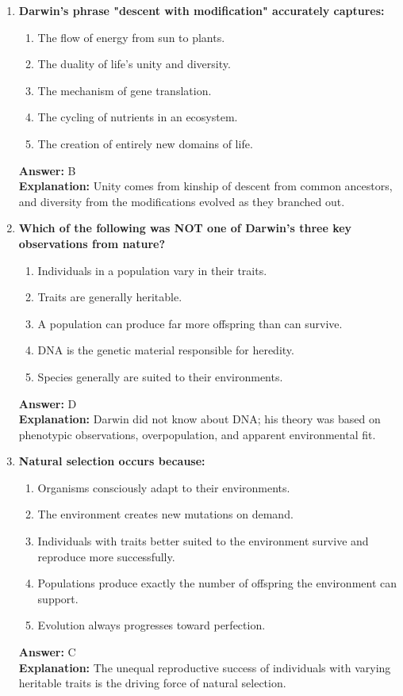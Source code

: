 \documentclass[11pt, a4paper]{article}
\begin{document}
\begin{enumerate}
\item \textbf{Darwin's phrase "descent with modification" accurately captures:}
\begin{enumerate}[label=\Alph*.]
    \item The flow of energy from sun to plants.
    \item The duality of life's unity and diversity.
    \item The mechanism of gene translation.
    \item The cycling of nutrients in an ecosystem.
    \item The creation of entirely new domains of life.
\end{enumerate}
\textbf{Answer:} B \\
\textbf{Explanation:} Unity comes from kinship of descent from common ancestors, and diversity from the modifications evolved as they branched out.

\item \textbf{Which of the following was NOT one of Darwin's three key observations from nature?}
\begin{enumerate}[label=\Alph*.]
    \item Individuals in a population vary in their traits.
    \item Traits are generally heritable.
    \item A population can produce far more offspring than can survive.
    \item DNA is the genetic material responsible for heredity.
    \item Species generally are suited to their environments.
\end{enumerate}
\textbf{Answer:} D \\
\textbf{Explanation:} Darwin did not know about DNA; his theory was based on phenotypic observations, overpopulation, and apparent environmental fit.

\item \textbf{Natural selection occurs because:}
\begin{enumerate}[label=\Alph*.]
    \item Organisms consciously adapt to their environments.
    \item The environment creates new mutations on demand.
    \item Individuals with traits better suited to the environment survive and reproduce more successfully.
    \item Populations produce exactly the number of offspring the environment can support.
    \item Evolution always progresses toward perfection.
\end{enumerate}
\textbf{Answer:} C \\
\textbf{Explanation:} The unequal reproductive success of individuals with varying heritable traits is the driving force of natural selection.


\end{enumerate}
\end{document}
